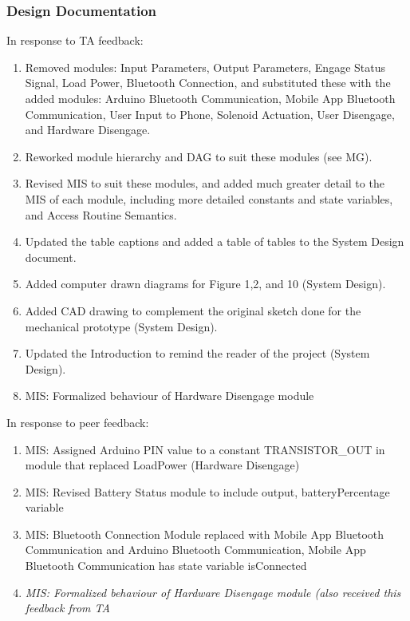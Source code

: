 \documentclass{article}
\begin{document}
\subsubsection{Design Documentation}
In response to TA feedback:
\begin{enumerate}
    \item Removed modules: Input Parameters, Output Parameters, Engage Status Signal, Load Power, Bluetooth Connection, and substituted these with the added modules: Arduino Bluetooth Communication, Mobile App Bluetooth Communication, User Input to Phone, Solenoid Actuation, User Disengage, and Hardware Disengage.
    \item Reworked module hierarchy and DAG to suit these modules (see MG).
    \item Revised MIS to suit these modules, and added much greater detail to the MIS of each module, including more detailed constants and state variables, and Access Routine Semantics.
    \item Updated the table captions and added a table of tables to the System Design document. 
    \item Added computer drawn diagrams for Figure 1,2, and 10 (System Design).
    \item Added CAD drawing to complement the original sketch done for the mechanical prototype (System Design).
    \item Updated the Introduction to remind the reader of the project (System Design).
   \item MIS: Formalized behaviour of Hardware Disengage module
\end{enumerate}

\noindent In response to peer feedback:
\begin{enumerate}
    \item MIS: Assigned Arduino PIN value to a constant TRANSISTOR\_OUT in module that replaced LoadPower (Hardware Disengage)
    \item MIS: Revised Battery Status module to include output, batteryPercentage variable
    \item MIS: Bluetooth Connection Module replaced with Mobile App Bluetooth Communication and Arduino Bluetooth Communication, Mobile App Bluetooth Communication has state variable isConnected
\item \textit{MIS: Formalized behaviour of Hardware Disengage module (also received this feedback from TA}
\end{enumerate}
\end{document}
